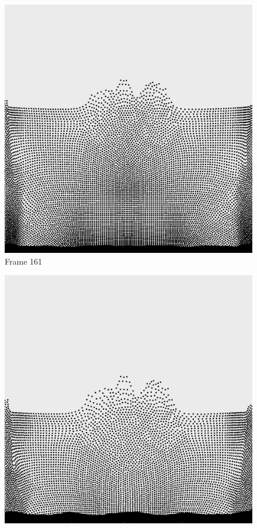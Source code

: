 \documentclass[a4paper, 12pt, oneside]{book}
\begin{document}
\begin{figure}[!ht]
    \addvspace{0.5ex}
        \begin{center}
            \includegraphics[width=\linewidth]{images/test_case_1/161.png}
            Frame 161
        \end{center}
    \endminipage
    \hfill
        \begin{center}
            \includegraphics[width=\linewidth]{images/test_case_1/181.png}

\end{center}
\end{figure}
\end{document}
